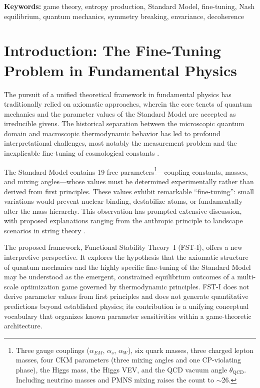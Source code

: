 \documentclass[12pt,a4paper]{article}
\theoremstyle{remark}
\begin{document}
\textbf{Keywords:} game theory, entropy production, Standard Model, fine-tuning, Nash equilibrium, quantum mechanics, symmetry breaking, envariance, decoherence

\clearpage

\section{Introduction: The Fine-Tuning Problem in Fundamental Physics}
\label{sec:introduction}

The pursuit of a unified theoretical framework in fundamental physics has traditionally relied on axiomatic approaches, wherein the core tenets of quantum mechanics and the parameter values of the Standard Model are accepted as irreducible givens. The historical separation between the microscopic quantum domain and macroscopic thermodynamic behavior has led to profound interpretational challenges, most notably the measurement problem and the inexplicable fine-tuning of cosmological constants \citep{Adams2019}.

The Standard Model contains 19 free parameters\footnote{Three gauge couplings ($\alpha_{EM}$, $\alpha_s$, $\alpha_W$), six quark masses, three charged lepton masses, four CKM parameters (three mixing angles and one CP-violating phase), the Higgs mass, the Higgs VEV, and the QCD vacuum angle $\theta_{\text{QCD}}$. Including neutrino masses and PMNS mixing raises the count to $\sim$26.}---coupling constants, masses, and mixing angles---whose values must be determined experimentally rather than derived from first principles. These values exhibit remarkable ``fine-tuning'': small variations would prevent nuclear binding, destabilize atoms, or fundamentally alter the mass hierarchy. This observation has prompted extensive discussion, with proposed explanations ranging from the anthropic principle \citep{Weinberg1987,Susskind2005} to landscape scenarios in string theory \citep{Bousso2000}.

The proposed framework, Functional Stability Theory~I (FST-I), offers a new interpretive perspective. It explores the hypothesis that the axiomatic structure of quantum mechanics and the highly specific fine-tuning of the Standard Model may be understood as the emergent, constrained equilibrium outcomes of a multi-scale optimization game governed by thermodynamic principles. FST-I does not derive parameter values from first principles and does not generate quantitative predictions beyond established physics; its contribution is a unifying conceptual vocabulary that organizes known parameter sensitivities within a game-theoretic architecture.
\end{document}
